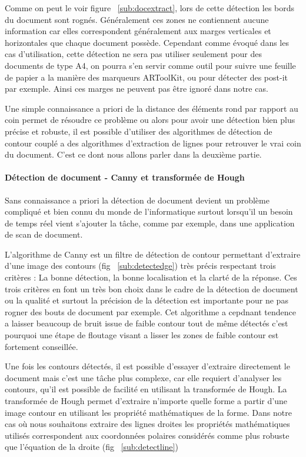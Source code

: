 Comme on peut le voir figure ~\ref{sub:docextract}, lors de cette détection les bords du document sont rognés. Généralement ces zones ne contiennent aucune information car elles correspondent généralement aux marges verticales et horizontales que chaque document possède. Cependant comme évoqué dans les cas d'utilisation, cette détection ne sera pas utiliser seulement pour des documents de type A4, on pourra s'en servir comme outil pour suivre une feuille de papier a la manière des marqueurs ARToolKit, ou pour détecter des post-it par exemple. Ainsi ces marges ne peuvent pas être ignoré dans notre cas.

Une simple connaissance a priori de la distance des éléments rond par rapport au coin permet de résoudre ce problème ou alors pour avoir une détection bien plus précise et robuste, il est possible d'utiliser des algorithmes de détection de contour couplé a des algorithmes d'extraction de lignes pour retrouver le vrai coin du document. C'est ce dont nous allons parler dans la deuxième partie.

\paragraph{Détection de document - Canny et transformée de Hough} Sans connaissance a priori la détection de document devient un problème compliqué et bien connu du monde de l'informatique surtout lorsqu'il un besoin de temps réel vient s'ajouter la tâche, comme par exemple, dans une application de scan de document.

L'algorithme de Canny\cite{Canny86acomputational} est un filtre de détection de contour permettant d'extraire d'une image des contours (fig ~\ref{sub:detectedge}) très précis respectant trois critères : La bonne détection, la bonne localisation et la clarté de la réponse. Ces trois critères en font un très bon choix dans le cadre de la détection de document ou la qualité et surtout la précision de la détection est importante pour ne pas rogner des bouts de document par exemple. Cet algorithme a cepdnant tendence a laisser beaucoup de bruit issue de faible contour tout de même détectés c'est pourquoi une étape de floutage visant a lisser les zones de faible contour est fortement conseillée.

Une fois les contours détectés, il est possible d'essayer d'extraire directement le document mais c'est une tâche plus complexe, car elle requiert d'analyser les contours, qu'il est possible de facilité en utilisant la transformée de Hough\cite{hough}. La transformée de Hough permet d'extraire n'importe quelle forme a partir d'une image contour en utilisant les propriété mathématiques de la forme. Dans notre cas où nous souhaitons extraire des lignes droites les propriétés mathématiques utilisés correspondent aux coordonnées polaires considérés comme plus robuste que l’équation de la droite (fig ~\ref{sub:detectline})

